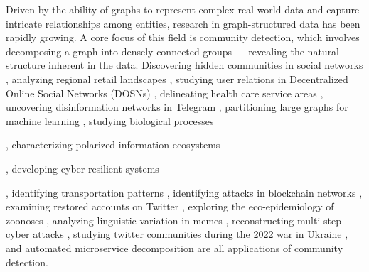 Driven by the ability of graphs to represent complex real-world data and capture intricate relationships among entities, research in graph-structured data has been rapidly growing. A core focus of this field is community detection, which involves decomposing a graph into densely connected groups --- revealing the natural structure inherent in the data. Discovering hidden communities in social networks \cite{blekanov2021detection}, analyzing regional retail landscapes \cite{verhetsel2022regional}, studying user relations in Decentralized Online Social Networks (DOSNs) \cite{la2022information}, delineating health care service areas \cite{wang2021network}, uncovering disinformation networks in Telegram \cite{la2021uncovering}, partitioning large graphs for machine learning \cite{bai2024leiden}, studying biological processes \cite{heumos2023best}, characterizing polarized information ecosystems \cite{uyheng2021mainstream}, developing cyber resilient systems \cite{chernikova2022cyber}, identifying transportation patterns \cite{chen2023deciphering}, identifying attacks in blockchain networks \cite{erfan2023community}, examining restored accounts on Twitter \cite{kapoor2021ll}, exploring the eco-epidemiology of zoonoses \cite{desvars2024one}, analyzing linguistic variation in memes \cite{zhou2023social}, reconstructing multi-step cyber attacks \cite{zang2023attack}, studying twitter communities during the 2022 war in Ukraine \cite{sliwa2024case}, and automated microservice decomposition \cite{cao2022implementation} are all applications of community detection.

